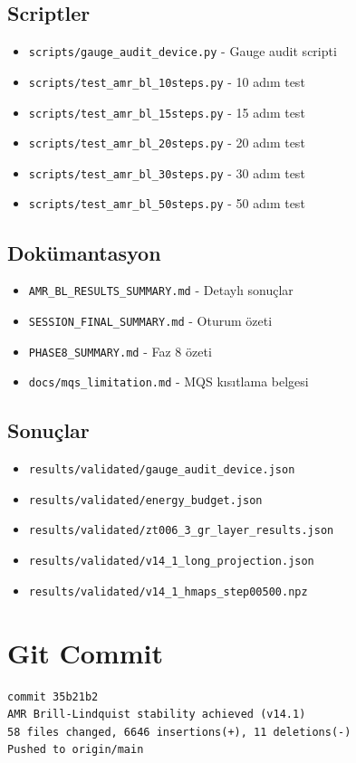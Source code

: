 \documentclass[11pt,a4paper]{article}
\begin{document}
\subsection*{Scriptler}
\begin{itemize}
    \item \texttt{scripts/gauge\_audit\_device.py} - Gauge audit scripti
    \item \texttt{scripts/test\_amr\_bl\_10steps.py} - 10 adım test
    \item \texttt{scripts/test\_amr\_bl\_15steps.py} - 15 adım test
    \item \texttt{scripts/test\_amr\_bl\_20steps.py} - 20 adım test
    \item \texttt{scripts/test\_amr\_bl\_30steps.py} - 30 adım test
    \item \texttt{scripts/test\_amr\_bl\_50steps.py} - 50 adım test
\end{itemize}

\subsection*{Dokümantasyon}
\begin{itemize}
    \item \texttt{AMR\_BL\_RESULTS\_SUMMARY.md} - Detaylı sonuçlar
    \item \texttt{SESSION\_FINAL\_SUMMARY.md} - Oturum özeti
    \item \texttt{PHASE8\_SUMMARY.md} - Faz 8 özeti
    \item \texttt{docs/mqs\_limitation.md} - MQS kısıtlama belgesi
\end{itemize}

\subsection*{Sonuçlar}
\begin{itemize}
    \item \texttt{results/validated/gauge\_audit\_device.json}
    \item \texttt{results/validated/energy\_budget.json}
    \item \texttt{results/validated/zt006\_3\_gr\_layer\_results.json}
    \item \texttt{results/validated/v14\_1\_long\_projection.json}
    \item \texttt{results/validated/v14\_1\_hmaps\_step00500.npz}
\end{itemize}

\section*{Git Commit}
\begin{verbatim}
commit 35b21b2
AMR Brill-Lindquist stability achieved (v14.1)
58 files changed, 6646 insertions(+), 11 deletions(-)
Pushed to origin/main
\end{verbatim}
\end{document}
